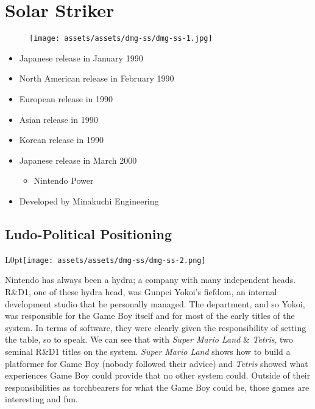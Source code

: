 \documentclass{book}
\begin{document}
\chapter*{Solar Striker}
\vspace{\baselineskip}\begin{figure}[H]{\texttt{[image: assets/assets/dmg-ss/dmg-ss-1.jpg]}}\end{figure}\vspace{\baselineskip}
\begin{itemize}[left=0pt, nosep]
\item Japanese release in January 1990
\item North American release in February 1990
\item European release in 1990
\item Asian release in 1990
\item Korean release in 1990
\item Japanese release in March 2000
\begin{itemize}
\item Nintendo Power
\end{itemize}
\item Developed by Minakuchi Engineering

\end{itemize}
\newpage\FloatBarrier\section*{Ludo-Political Positioning}
\begin{wrapfigure}{L}{0pt}{\texttt{[image: assets/assets/dmg-ss/dmg-ss-2.png]}}\end{wrapfigure}\noindent
Nintendo has always been a hydra; a company with many independent heads. R\&D1, one of these hydra head, was Gunpei Yokoi’s fiefdom, an internal development studio that he personally managed. The department, and so Yokoi, was responsible for the Game Boy itself and for most of the early titles of the system. In terms of software, they were clearly given the responsibility of setting the table, so to speak. We can see that with \emph{Super Mario Land} \& \emph{Tetris}, two seminal R\&D1 titles on the system. \emph{Super Mario Land} shows how to build a platformer for Game Boy (nobody followed their advice) and \emph{Tetris} showed what experiences Game Boy could provide that no other system could. Outside of their responsibilities as torchbearers for what the Game Boy could be, those games are interesting and fun.\par
\end{document}
